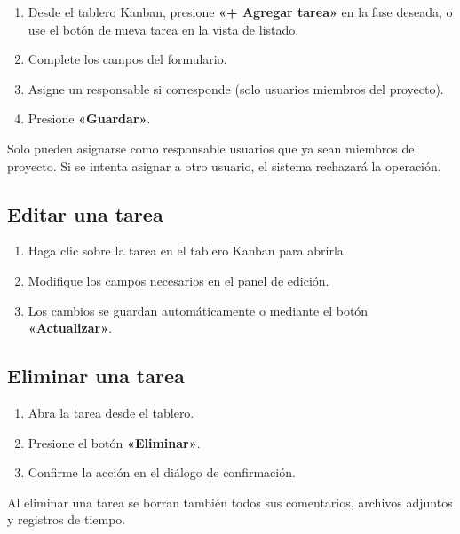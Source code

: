 \documentclass[12pt, a4paper]{article}
\begin{document}
\begin{enumerate}
  \item Desde el tablero Kanban, presione \textbf{«+ Agregar tarea»} en la fase deseada, o use el botón de nueva tarea en la vista de listado.
  \item Complete los campos del formulario.
  \item Asigne un responsable si corresponde (solo usuarios miembros del proyecto).
  \item Presione \textbf{«Guardar»}.
\end{enumerate}

\begin{infobox}
Solo pueden asignarse como responsable usuarios que ya sean miembros del proyecto. Si se intenta asignar a otro usuario, el sistema rechazará la operación.
\end{infobox}

\subsection{Editar una tarea}

\begin{enumerate}
  \item Haga clic sobre la tarea en el tablero Kanban para abrirla.
  \item Modifique los campos necesarios en el panel de edición.
  \item Los cambios se guardan automáticamente o mediante el botón \textbf{«Actualizar»}.
\end{enumerate}

\subsection{Eliminar una tarea}

\begin{enumerate}
  \item Abra la tarea desde el tablero.
  \item Presione el botón \textbf{«Eliminar»}.
  \item Confirme la acción en el diálogo de confirmación.
\end{enumerate}

\begin{warningbox}
Al eliminar una tarea se borran también todos sus comentarios, archivos adjuntos y registros de tiempo.
\end{warningbox}
\end{document}
